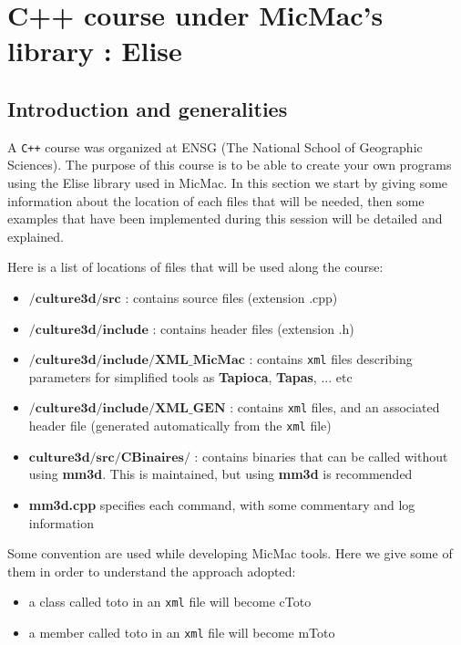 

\section{C++ course under MicMac's library : Elise}
\subsection{Introduction and generalities}
A \verb!C++! course was organized at ENSG (The National School of Geographic Sciences). The purpose of this course is to be able to create your own programs using the Elise library used in MicMac. In this section we start by giving some information about the location of each files that will be needed, then some examples that have been implemented during this session will be detailed and explained.\newline

Here is a list of locations of files that will be used along the course:\newline
\begin{itemize}
\item $\textbf{/culture3d/src}$ : contains source files (extension .cpp) \newline
\item $\textbf{/culture3d/include}$ : contains header files (extension .h)\newline
\item $\textbf{/culture3d/include/XML\_MicMac}$ : contains \verb!xml! files describing parameters for simplified tools as \textbf{Tapioca}, \textbf{Tapas}, ... etc\newline
\item $\textbf{/culture3d/include/XML\_GEN}$ : contains \verb!xml! files, and an associated header file (generated automatically from the \verb!xml! file)\newline
\item $\textbf{culture3d/src/CBinaires/}$ : contains binaries that can be called without using \textbf{mm3d}. This is maintained, but using \textbf{mm3d} is recommended\newline
\item \textbf{mm3d.cpp} specifies each command, with some commentary and log information\newline
\end{itemize}

Some convention are used while developing MicMac tools. Here we give some of them in order to understand the approach adopted: \newline
\begin{itemize}
\item a class called toto in an \verb!xml! file will become cToto \newline
\item a member called toto in an \verb!xml! file will become mToto \newline
\end{itemize}

